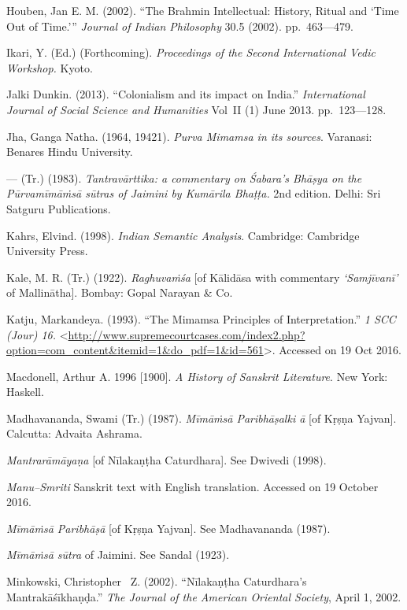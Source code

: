 \begin{thebibliography}{99}
  Houben, Jan E. M. (2002). “The Brahmin Intellectual: History, Ritual and ‘Time Out of Time.’” \textit{Journal of Indian Philosophy} 30.5 (2002). pp.~463––479.

  Ikari, Y. (Ed.) (Forthcoming). \textit{Proceedings of the Second International Vedic Workshop.} Kyoto.

  Jalki Dunkin. (2013). “Colonialism and its impact on India.” \textit{International Journal of Social Science and Humanities} Vol~II (1) June 2013. pp.~123––128.

  Jha, Ganga Natha. (1964, 19421). \textit{Purva Mimamsa in its sources}. Varanasi: Benares Hindu University.

  — (Tr.) (1983). \textit{Tantravārttika: a commentary on Śabara's Bhāṣya on the Pūrvamīmāṁsā sūtras of Jaimini by Kumārila Bhaṭṭa.} 2nd edition. Delhi: Sri Satguru Publications.

  Kahrs, Elvind. (1998). \textit{Indian Semantic Analysis}. Cambridge: Cambridge University Press.

  Kale, M. R. (Tr.) (1922). \textit{Raghuvaṁśa} [of Kālidāsa with commentary \textit{‘Samjīvanī’} of Mallinātha]. Bombay: Gopal Narayan \& Co.

  Katju, Markandeya. (1993). “The Mimamsa Principles of Interpretation.” \textit{1 SCC (Jour) 16.} \textless  \url{http://www.supremecourtcases.com/index2.php?option=com_content&itemid=1&do_pdf=1&id=561}\textgreater . Accessed on 19 Oct 2016.

  Macdonell, Arthur A. 1996 [1900]. \textit{A History of Sanskrit Literature}. New York: Haskell.  

  Madhavananda, Swami (Tr.) (1987). \textit{Mīmāṁsā Paribhāṣalki ā} [of Kṛṣṇa Yajvan]. Calcutta: Advaita Ashrama.

  \textit{Mantrarāmāyaṇa} [of Nīlakaṇṭha Caturdhara]. See Dwivedi (1998).

  \textit{Manu–Smriti} Sanskrit text with English translation. Accessed on 19 October 2016.

  \textit{Mīmāṁsā Paribhāṣā} [of Kṛṣṇa Yajvan]. See Madhavananda (1987).

  \textit{Mīmāṁsā sūtra} of Jaimini. See Sandal (1923).

  Minkowski, Christopher  Z. (2002). “Nīlakaṇṭha Caturdhara's Mantrakāśīkhaṇḍa.” \textit{The Journal of the American Oriental Society}, April 1, 2002.


\end{thebibliography}
